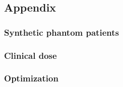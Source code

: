 \subsection*{Appendix}

\subsubsection*{Synthetic phantom patients}
%
%	

\subsubsection*{Clinical dose}


\subsubsection*{Optimization}




